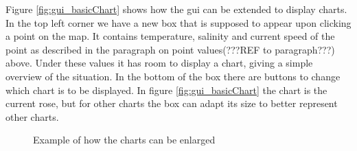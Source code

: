 \documentclass[11pt,a4paper,titlepage,oneside]{report}
\begin{document}
Figure \ref{fig:gui_basicChart} shows how the gui can be extended to display charts. In the top left corner we have a new box that is supposed to appear upon clicking a point on the map. It contains temperature, salinity and current speed of the point as described in the paragraph on point values(???REF to paragraph???) above. Under these values it has room to display a chart, giving a simple overview of the situation. In the bottom of the box there are buttons to change which chart is to be displayed. In figure \ref{fig:gui_basicChart} the chart is the current rose, but for other charts the box can adapt its size to better represent other charts.
\begin{figure}[!htb]
  \begin{center}
    \caption{Example of how the charts can be enlarged}
    \label{fig:gui_enlargedChart}
  \end{center}
\end{figure}
\end{document}
